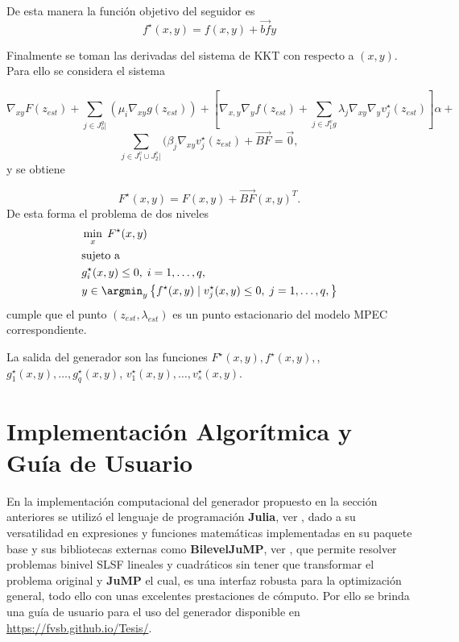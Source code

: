 De esta manera la función objetivo del seguidor es
$$f^{\star}(x,y)=f(x,y)+\vec{bf}y$$


Finalmente se toman  las derivadas del sistema de KKT con respecto a $(x,y)$. Para ello  se considera el sistema
 
    $$
       \nabla_{xy}F(z_{est})+\sum_{j\in J_o^g|}(\mu_i\nabla_{xy}g(z_{est}))+[\nabla_{x,y}\nabla_{y}f(z_{est})+\sum_{j \in J_1^vg}\lambda_j\nabla_{xy}\nabla_{y}v_{j}^{\star}(z_{est})]\alpha+$$ $$\sum_{j \in J_1^v \cup J_2^v|}(\beta_j\nabla_{xy}v_{j}^{\star}(z_{est})+\vec{BF}=\vec{0},
   $$
y se obtiene

$$F^{\star}(x,y)=F(x,y)+\vec{BF}(x,y)^T.$$
De esta forma el problema de dos niveles 
\begin{equation}
\begin{aligned}
& \min_{x} \; F^{\star}(x, y) \\
& \text{sujeto a } \\
& g_i^{\star}(x, y)\leq 0,\;i=1,\ldots,q, \\
& y \in \argmin_{y} \left\{ f^{\star}(x, y) \mid v_j^{\star}(x, y)\leq 0,\;j=1,\ldots,q ,\right\}
\end{aligned}
\end{equation}
cumple que el punto $(z_{est},\lambda_{est})$ es un punto estacionario del modelo MPEC correspondiente.

La salida del generador son las funciones $F^{\star}(x,y), f^{\star}(x,y),$, $g_1^{\star}(x,y),\ldots,g_q^{\star}(x,y)$, $v_1^{\star}(x,y),\ldots,v_s^{\star}(x,y)$.

\section{Implementación Algorítmica y Guía de Usuario}
En la implementación computacional del generador propuesto en la sección anteriores
se utilizó el lenguaje de programación \textbf{Julia}, ver \cite{Juliadocs}, dado a su versatilidad
en expresiones y funciones matemáticas implementadas en su paquete base y sus bibliotecas externas como 
\textbf{BilevelJuMP}, ver \cite{BilevelJump}, que permite resolver problemas binivel SLSF lineales y cuadráticos
sin tener que transformar el problema original y \textbf{JuMP} \cite{JuMPPaper} el cual, es una interfaz robusta para la optimización general,
todo ello con unas excelentes prestaciones de cómputo. Por ello se brinda una guía de usuario para el uso del generador disponible en 
\href{https://fvsb.github.io/Tesis/}{https://fvsb.github.io/Tesis/}.  

